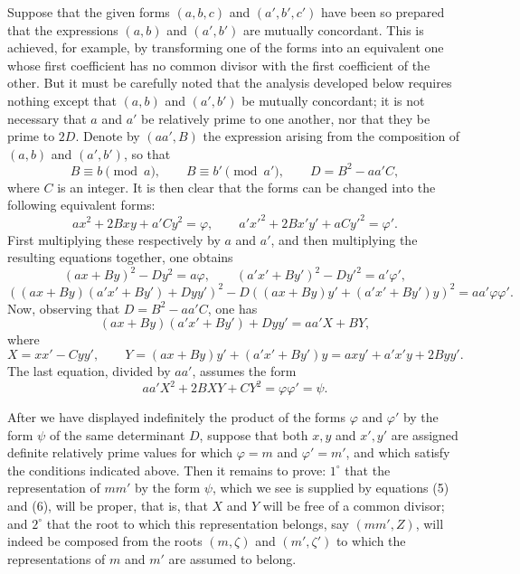 \documentclass[11pt]{article}
\begin{document}
Suppose that the given forms $(a,b,c)$ and $(a',b',c')$ have been so prepared that the expressions $(a,b)$ and $(a',b')$ are mutually concordant. This is achieved, for example, by transforming one of the forms into an equivalent one whose first coefficient has no common divisor with the first coefficient of the other. But it must be carefully noted that the analysis developed below requires nothing except that $(a,b)$ and $(a',b')$ be mutually concordant; it is not necessary that $a$ and $a'$ be relatively prime to one another, nor that they be prime to $2D$. Denote by $(aa',B)$ the expression arising from the composition of $(a,b)$ and $(a',b')$, so that
\[
 B\equiv b\pmod a,\qquad B\equiv b'\pmod {a'},\qquad D=B^2-aa'C,
\]
where $C$ is an integer. It is then clear that the forms can be changed into the following equivalent forms:
\[
 ax^2+2Bxy+a'Cy^2=\varphi,
 \qquad
 a'x'^2+2Bx'y'+aCy'^2=\varphi'.
\]
First multiplying these respectively by $a$ and $a'$, and then multiplying the resulting equations together, one obtains
\[
 (ax+By)^2-Dy^2=a\varphi,
 \qquad
 (a'x'+By')^2-Dy'^2=a'\varphi',
\]
\[
 ((ax+By)(a'x'+By')+Dyy')^2-D((ax+By)y'+(a'x'+By')y)^2=aa'\varphi\varphi'.
\]
Now, observing that $D=B^2-aa'C$, one has
\begin{equation}\tag{4}
 (ax+By)(a'x'+By')+Dyy'=aa'X+BY,
\end{equation}
where
\begin{equation}\tag{5}
 X=xx'-Cyy',\qquad Y=(ax+By)y'+(a'x'+By')y=axy'+a'x'y+2Byy'.
\end{equation}
The last equation, divided by $aa'$, assumes the form
\begin{equation}\tag{6}
 aa'X^2+2BXY+CY^2=\varphi\varphi'=\psi.
\end{equation}

After we have displayed indefinitely the product of the forms $\varphi$ and $\varphi'$ by the form $\psi$ of the same determinant $D$, suppose that both $x,y$ and $x',y'$ are assigned definite relatively prime values for which $\varphi=m$ and $\varphi'=m'$, and which satisfy the conditions indicated above. Then it remains to prove: $1^\circ$ that the representation of $mm'$ by the form $\psi$, which we see is supplied by equations (5) and (6), will be proper, that is, that $X$ and $Y$ will be free of a common divisor; and $2^\circ$ that the root to which this representation belongs, say $(mm',Z)$, will indeed be composed from the roots $(m,\zeta)$ and $(m',\zeta')$ to which the representations of $m$ and $m'$ are assumed to belong.
\end{document}
